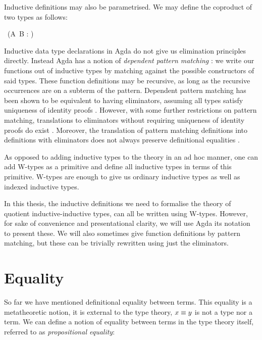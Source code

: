 Inductive definitions may also be parametrised. We may define the
coproduct of two types as follows:
\begin{datatype}{\sumty{\_}{\_}\ (A\ B : \Set)}{\Set}
   \\
\end{datatype}

Inductive data type declarations in Agda do not give us elimination
principles directly. Instead Agda has a notion of \emph{dependent
  pattern matching} \cite{Coquand1992}: we write our functions out of
inductive types by matching against the possible constructors of said
types. These function definitions may be recursive, as long as the
recursive occurrences are on a subterm of the pattern. Dependent
pattern matching has been shown to be equivalent to having
eliminators, assuming all types satisfy uniqueness of identity proofs
\cite{Goguen2006}. However, with some further restrictions on pattern
matching, translations to eliminators without requiring uniqueness of
identity proofs do exist \cite{Cockx2014}. Moreover, the translation
of pattern matching definitions into definitions with eliminators does
not always preserve definitional equalities \cite{McBride2006ii}.

As opposed to adding inductive types to the theory in an ad hoc
manner, one can add W-types as a primitive and define all inductive
types in terms of this primitive. W-types are enough to give us
ordinary inductive types as well as indexed inductive types.

In this thesis, the inductive definitions we need to formalise the
theory of quotient inductive-inductive types, can all be written using
W-types. However, for sake of convenience and presentational clarity,
we will use Agda its notation to present these. We will also sometimes
give function definitions by pattern matching, but these can be
trivially rewritten using just the eliminators.

\section{Equality}

So far we have mentioned definitional equality between terms. This
equality is a metatheoretic notion, it is external to the type theory,
\ie $x \equiv y$ is not a type nor a term. We can define a notion of
equality between terms in the type theory itself, referred to as
\emph{propositional equality}:

